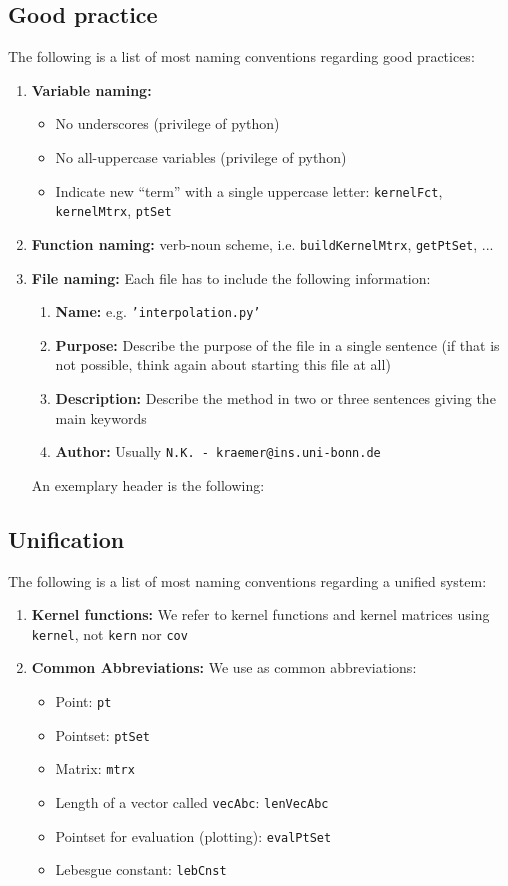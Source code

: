 \documentclass[11pt]{article}
\begin{document}
\subsection{Good practice}
The following is a list of most naming conventions regarding good practices:
\begin{enumerate}
\item \textbf{Variable naming:} 
\begin{itemize}
\item No underscores (privilege of python)
\item No all-uppercase variables (privilege of python)
\item Indicate new ``term'' with a single uppercase letter: \texttt{kernelFct}, \texttt{kernelMtrx}, \texttt{ptSet}
\end{itemize}
\item \textbf{Function naming:} verb-noun scheme, i.e. \texttt{buildKernelMtrx}, \texttt{getPtSet}, ...
\item \textbf{File naming:} Each file has to include the following information:
\begin{enumerate}
\item \textbf{Name:} e.g. \texttt{'interpolation.py'}
\item \textbf{Purpose:} Describe the purpose of the file in a single sentence (if that is not possible, think again about starting this file at all)
\item \textbf{Description:} Describe the method in two or three sentences giving the main keywords
\item \textbf{Author:} Usually \texttt{N.K. - kraemer@ins.uni-bonn.de}
\end{enumerate}
An exemplary header is the following:
\end{enumerate}

\subsection{Unification}
The following is a list of most naming conventions regarding a unified system:
\begin{enumerate}
\item \textbf{Kernel functions:} We refer to kernel functions and kernel matrices using \texttt{kernel}, not \texttt{kern} nor \texttt{cov}
\item \textbf{Common Abbreviations:} We use as common abbreviations:
\begin{itemize}
\item Point: \texttt{pt}
\item Pointset: \texttt{ptSet}
\item Matrix: \texttt{mtrx}
\item Length of a vector called \texttt{vecAbc}: \texttt{lenVecAbc}
\item Pointset for evaluation (plotting): \texttt{evalPtSet}
\item Lebesgue constant: \texttt{lebCnst}
\end{itemize}
\end{enumerate}
\end{document}
